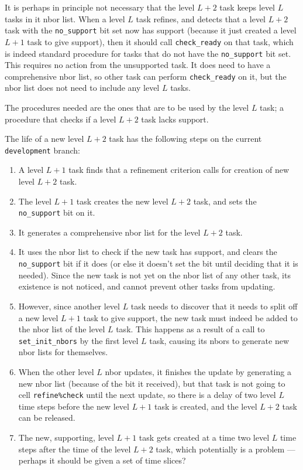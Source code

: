 \documentclass[paper=a4,fontsize=11pt]{scrartcl}
\numberwithin{equation}{section}		%
\numberwithin{figure}{section}			%
\numberwithin{table}{section}				%
\newcommand{\gitcolor}{\color{Brown}}
\newcommand{\codecolor}{\color{Blue}}
\newcommand{\Git}[1]{\texttt{\gitcolor #1}}
\newcommand{\Code}[1]{{\codecolor\texttt{#1}}}
\begin{document}
It is perhaps in principle not necessary that the level $L+2$ task keeps level $L$ tasks in it nbor list.  When a level $L$ task refines, and detects that a level $L+2$ task with the \Code{no\_support} bit set now has support (because it just created a level $L+1$ task to give support), then it should call \Code{check\_ready} on that task, which is indeed standard procedure for tasks that do not have the \Code{no\_support} bit set.  This requires no action from the unsupported task.  It does need to have a comprehensive nbor list, so other task can perform \Code{check\_ready} on it, but the nbor list does not need to include any level $L$ tasks.

The procedures needed are the ones that are to be used by the level $L$ task; a procedure that checks if a level $L+2$ task lacks support.

The life of a new level $L+2$ task has the following steps on the current \Git{development} branch:
\begin{enumerate}
    \item A level $L+1$ task finds that a refinement criterion calls for creation of new level $L+2$ task.  
    \item The level $L+1$ task creates the new level $L+2$ task, and sets the \Code{no\_support} bit on it.
    \item It generates a comprehensive nbor list for the level $L+2$ task.
    \item It uses the nbor list to check if the new task has support, and clears the \Code{no\_support} bit if it does (or else it doesn't set the bit until deciding that it is needed).  Since the new task is not yet on the nbor list of any other task, its existence is not noticed, and cannot prevent other tasks from updating.
    \item However, since another level $L$ task needs to discover that it needs to split off a new level $L+1$ task to give support, the new task must indeed be added to the nbor list of the level $L$ task.  This happens as a result of a call to \Code{set\_init\_nbors} by the first level $L$ task, causing its nbors to generate new nbor lists for themselves.
    \item When the other level $L$ nbor updates, it finishes the update by generating a new nbor list (because of the bit it received), but that task is not going to cell \Code{refine\%check} until the next update, so there is a delay of two level $L$ time steps before the new level $L+1$ task is created, and the level $L+2$ task can be released.
    \item The new, supporting, level $L+1$ task gets created at a time two level $L$ time steps after the time of the level $L+2$ task, which potentially is a problem --- perhaps it should be given a set of time slices?
\end{enumerate}
\end{document}
